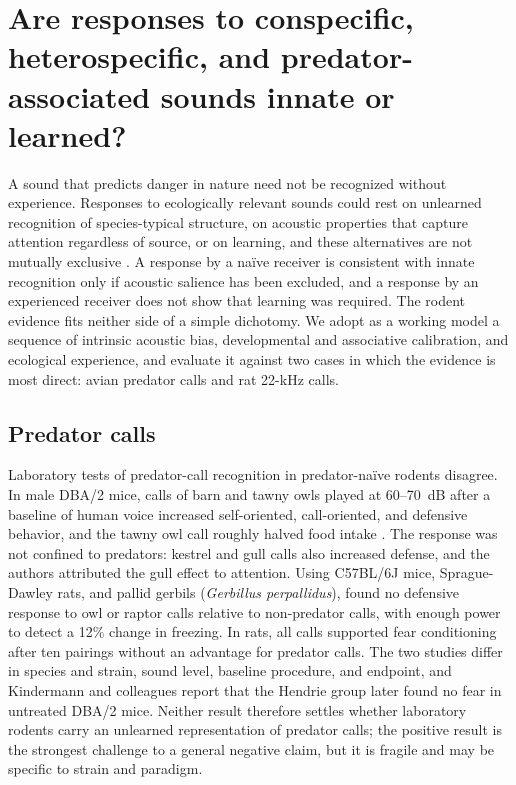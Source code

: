 \section{Are responses to conspecific, heterospecific, and predator-associated sounds innate or learned?}
\label{sec:q2}


A sound that predicts danger in nature need not be recognized without experience. Responses to ecologically relevant sounds could rest on unlearned recognition of species-typical structure, on acoustic properties that capture attention regardless of source, or on learning, and these alternatives are not mutually exclusive \citep{MagrathEtAl2015}. A response by a naïve receiver is consistent with innate recognition only if acoustic salience has been excluded, and a response by an experienced receiver does not show that learning was required. The rodent evidence fits neither side of a simple dichotomy. We adopt as a working model a sequence of intrinsic acoustic bias, developmental and associative calibration, and ecological experience, and evaluate it against two cases in which the evidence is most direct: avian predator calls and rat 22-kHz calls.

\subsection{Predator calls}
\label{sec:q2-predator}

Laboratory tests of predator-call recognition in predator-naïve rodents disagree. In male DBA/2 mice, calls of barn and tawny owls played at 60--70~dB after a baseline of human voice increased self-oriented, call-oriented, and defensive behavior, and the tawny owl call roughly halved food intake \citep{HendrieNeill1991}. The response was not confined to predators: kestrel and gull calls also increased defense, and the authors attributed the gull effect to attention. Using C57BL/6J mice, Sprague-Dawley rats, and pallid gerbils (\textit{Gerbillus perpallidus}), \citet{KindermannEtAl2009} found no defensive response to owl or raptor calls relative to non-predator calls, with enough power to detect a 12\% change in freezing. In rats, all calls supported fear conditioning after ten pairings without an advantage for predator calls. The two studies differ in species and strain, sound level, baseline procedure, and endpoint, and Kindermann and colleagues report that the Hendrie group later found no fear in untreated DBA/2 mice. Neither result therefore settles whether laboratory rodents carry an unlearned representation of predator calls; the positive result is the strongest challenge to a general negative claim, but it is fragile and may be specific to strain and paradigm.

